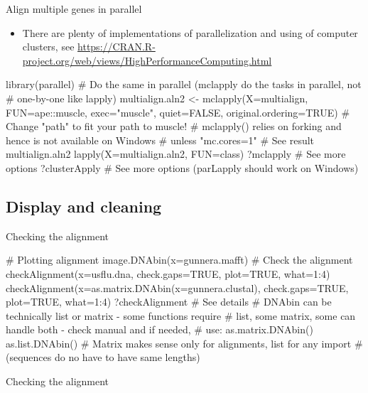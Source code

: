 \documentclass[compress, xelatex, 11pt, xcolor=svgnames, aspectratio=169,
	hyperref={
		bookmarks=true,
		unicode=true,
		colorlinks=true,
		pdftitle={Molecular data in R},
		plainpages=false,
		pdfauthor={Vojtech Zeisek},
		pdfsubject={Course about phylogeny and evolution in R},
		pdfcreator={XeLaTeX},
		pdfkeywords={R, evolution, phylogeny, molecular data},
		linkcolor=Crimson, %
		anchorcolor=Magenta, %
		citecolor=Magenta, %
		filecolor=Magenta, %
		menucolor=Magenta, %
		urlcolor=DodgerBlue, %
		},
	url={hyphens, lowtilde} %
	]{beamer}
\renewcommand{\texttt}[1]{\colorbox{Beige}{{\ttfamily #1}}}
\begin{document}
\begin{frame}[fragile]{Align multiple genes in parallel}
	\begin{itemize}
		\item There are plenty of implementations of parallelization and using of computer clusters, see \url{https://CRAN.R-project.org/web/views/HighPerformanceComputing.html}
	\end{itemize}
	\begin{spluscode}
    library(parallel)
    # Do the same in parallel (mclapply do the tasks in parallel, not
    # one-by-one like lapply)
    multialign.aln2 <- mclapply(X=multialign, FUN=ape::muscle,
      exec="muscle", quiet=FALSE, original.ordering=TRUE)
    # Change "path" to fit your path to muscle!
    # mclapply() relies on forking and hence is not available on Windows
    # unless "mc.cores=1"
    # See result
    multialign.aln2
    lapply(X=multialign.aln2, FUN=class)
    ?mclapply # See more options
    ?clusterApply # See more options (parLapply should work on Windows)
	\end{spluscode}
\end{frame}

\subsection{Display and cleaning}

\begin{frame}[fragile]{Checking the alignment}
	\begin{spluscode}
    # Plotting alignment
    image.DNAbin(x=gunnera.mafft)
    # Check the alignment
    checkAlignment(x=usflu.dna, check.gaps=TRUE, plot=TRUE, what=1:4)
    checkAlignment(x=as.matrix.DNAbin(x=gunnera.clustal), check.gaps=TRUE,
      plot=TRUE, what=1:4)
    ?checkAlignment # See details
    # DNAbin can be technically list or matrix - some functions require
    # list, some matrix, some can handle both - check manual and if needed,
    # use:
    as.matrix.DNAbin()
    as.list.DNAbin()
    # Matrix makes sense only for alignments, list for any import
    # (sequences do no have to have same lengths)
	\end{spluscode}
\end{frame}

\begin{frame}{Checking the alignment}
	\begin{center}
		\texttt{[image: checkalignment.png]}
	\end{center}
\end{frame}
\end{document}
